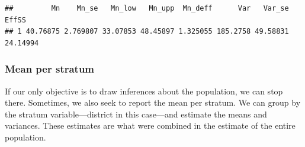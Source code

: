 \documentclass[
]{article}
\newenvironment{Shaded}{\begin{snugshade}}{\end{snugshade}}
\newcommand{\CommentTok}[1]{\textcolor[rgb]{0.56,0.35,0.01}{\textit{#1}}}
\newcommand{\DataTypeTok}[1]{\textcolor[rgb]{0.13,0.29,0.53}{#1}}
\newcommand{\KeywordTok}[1]{\textcolor[rgb]{0.13,0.29,0.53}{\textbf{#1}}}
\newcommand{\NormalTok}[1]{#1}
\newcommand{\OperatorTok}[1]{\textcolor[rgb]{0.81,0.36,0.00}{\textbf{#1}}}
\newcommand{\OtherTok}[1]{\textcolor[rgb]{0.56,0.35,0.01}{#1}}
\newcommand{\StringTok}[1]{\textcolor[rgb]{0.31,0.60,0.02}{#1}}
\begin{document}
\begin{Shaded}
\end{Shaded}

\begin{verbatim}
##         Mn    Mn_se   Mn_low   Mn_upp  Mn_deff      Var   Var_se    EffSS
## 1 40.76875 2.769807 33.07853 48.45897 1.325055 185.2758 49.58831 24.14994
\end{verbatim}

\hypertarget{mean-per-stratum}{%
\subsubsection{Mean per stratum}\label{mean-per-stratum}}

If our only objective is to draw inferences about the population, we can stop there. Sometimes, we also seek to report the mean per stratum. We can group by the stratum variable---district in this case---and estimate the means and variances. These estimates are what were combined in the estimate of the entire population.

\begin{Shaded}
\end{Shaded}
\end{document}
